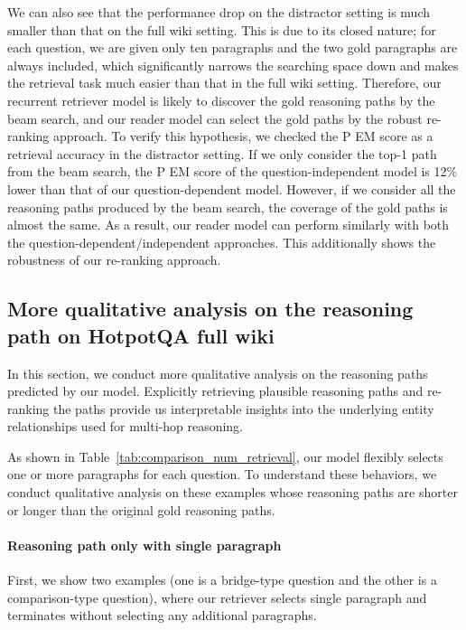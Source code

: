 We can also see that the performance drop on the distractor setting is much smaller than that on the full wiki setting.
This is due to its closed nature; for each question, we are given only ten paragraphs and the two gold paragraphs are always included, which significantly narrows the searching space down and makes the retrieval task much easier than that in the full wiki setting.
Therefore, our recurrent retriever model is likely to discover the gold reasoning paths by the beam search, and our reader model can select the gold paths by the robust re-ranking approach.
To verify this hypothesis, we checked the P EM score as a retrieval accuracy in the distractor setting.
If we only consider the top-1 path from the beam search, the P EM score of the question-independent model is 12\% lower than that of our question-dependent model.
However, if we consider all the reasoning paths produced by the beam search, the coverage of the gold paths is almost the same.
As a result, our reader model can perform similarly with both the question-dependent/independent approaches.
This additionally shows the robustness of our re-ranking approach.

\subsection{More qualitative analysis on the reasoning path on HotpotQA full wiki}
\label{subsec:appendix_qualitative_examples}

In this section, we conduct more qualitative analysis on the reasoning paths predicted by our model. 
Explicitly retrieving plausible reasoning paths and re-ranking the paths provide us interpretable insights into the underlying entity relationships used for multi-hop reasoning.

As shown in Table~\ref{tab:comparison_num_retrieval}, our model flexibly selects one or more paragraphs for each question. 
To understand these behaviors, we conduct qualitative analysis on these examples whose reasoning paths are shorter or longer than the original gold reasoning paths. 

\paragraph{Reasoning path only with single paragraph}
First, we show two examples (one is a bridge-type question and the other is a comparison-type question), where our retriever selects single paragraph and terminates without selecting any additional paragraphs.


